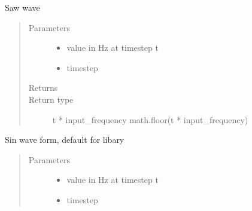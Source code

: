 \documentclass[letterpaper,10pt,english,openany,oneside]{sphinxmanual}
\begin{document}
\begin{fulllineitems}
\begin{fulllineitems}
\end{fulllineitems}



\begin{fulllineitems}
\sphinxAtStartPar
Saw wave
\begin{quote}\begin{description}
\item[{Parameters}] \leavevmode\begin{itemize}
\item {} 
\sphinxAtStartPar
{} \textendash{} value in Hz at timestep t

\item {} 
\sphinxAtStartPar
{} \textendash{} timestep

\end{itemize}

\item[{Returns}] \leavevmode
\sphinxAtStartPar


\item[{Return type}] \leavevmode
\sphinxAtStartPar
t * input\_frequency \sphinxhyphen{} math.floor(t * input\_frequency)

\end{description}\end{quote}

\end{fulllineitems}



\begin{fulllineitems}
\sphinxAtStartPar
Sin wave form, default for libary
\begin{quote}\begin{description}
\item[{Parameters}] \leavevmode\begin{itemize}
\item {} 
\sphinxAtStartPar
{} \textendash{} value in Hz at timestep t

\item {} 
\sphinxAtStartPar
{} \textendash{} timestep

\end{itemize}


\end{description}
\end{quote}
\end{fulllineitems}
\end{fulllineitems}
\end{document}
